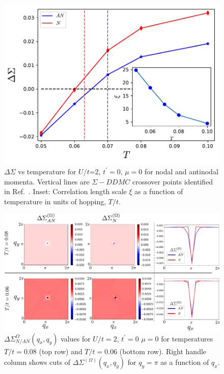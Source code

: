 \documentclass[twocolumn,notitlepage,prb,superscriptaddress,showpacs]{revtex4-1}
\begin{document}
\begin{figure}
\centering
    \includegraphics[width=0.95\linewidth]{deltasigma_cor.pdf}
\caption{\label{fig:lowt} $\Delta \Sigma$ vs temperature for $U/t$=2, $t^\prime=0$, $\mu=0$ for nodal and antinodal momenta.  Vertical lines are $\Sigma - DDMC$ crossover points identified in Ref.~.  Inset: Correlation length scale $\xi$ as a function of temperature in units of hopping, $T/t$. }
\end{figure} 

\begin{figure}
\centering
        \includegraphics[width=\linewidth]{fig8.pdf}
        \caption{ \label{fig:lowt2}$\Delta \Sigma_{N/AN}^{\Omega} (q_x,q_y)$  values for $U/t=2$, $t^{\prime}=0$ $\mu=0$ for temperatures $T/t=0.08$ (top row) and $T/t=0.06$ (bottom row). Right handle column shows cuts of $\Delta \Sigma^{(\Omega)}(q_x,q_y)$ for $q_y=\pi$ as a function of $q_x$.
        }
    \end{figure}
\end{document}
